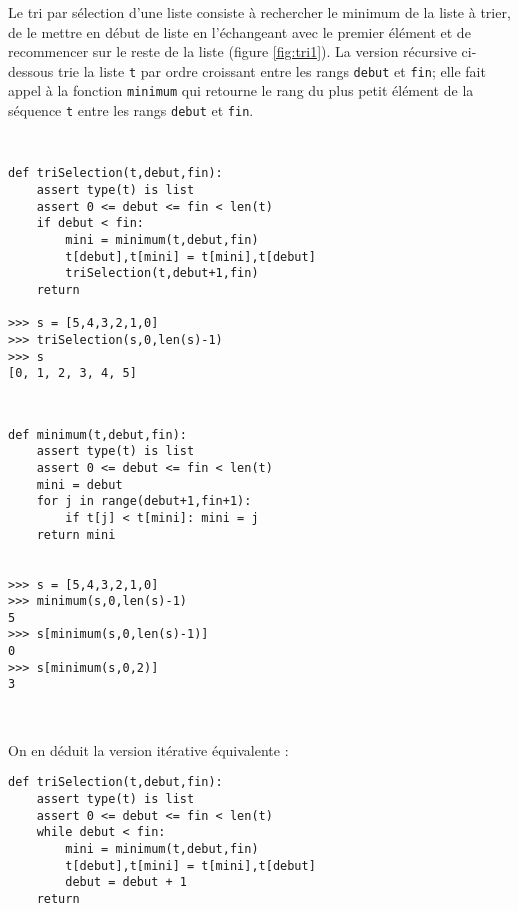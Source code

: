Le tri par sélection d'une liste consiste à rechercher le minimum de la liste
à trier, de le mettre en début de liste en l'échangeant avec le premier élément
et de recommencer sur le reste de la liste (figure \ref{fig:tri1}).
La version récursive ci-dessous trie la liste {\tt t} par ordre croissant 
entre les rangs {\tt debut} et {\tt fin}; elle fait appel à la fonction {\tt minimum}
qui retourne le rang du plus petit élément de la séquence {\tt t} entre les rangs
{\tt debut} et {\tt fin}.
 
\noindent\mbox{}\hspace*{1cm}\begin{py}{8cm}\tt
\begin{verbatim}
def triSelection(t,debut,fin):
    assert type(t) is list
    assert 0 <= debut <= fin < len(t)
    if debut < fin:
        mini = minimum(t,debut,fin)
        t[debut],t[mini] = t[mini],t[debut]
        triSelection(t,debut+1,fin)
    return

>>> s = [5,4,3,2,1,0]
>>> triSelection(s,0,len(s)-1)
>>> s
[0, 1, 2, 3, 4, 5]
\end{verbatim}
\end{py}
\hfill
\begin{py}{7cm}\tt
\begin{verbatim}
def minimum(t,debut,fin):
    assert type(t) is list
    assert 0 <= debut <= fin < len(t)
    mini = debut
    for j in range(debut+1,fin+1):
        if t[j] < t[mini]: mini = j
    return mini


>>> s = [5,4,3,2,1,0]
>>> minimum(s,0,len(s)-1)
5
>>> s[minimum(s,0,len(s)-1)]
0
>>> s[minimum(s,0,2)]
3
\end{verbatim}
\end{py}\\

\newpage
On en déduit la version itérative équivalente :
\begin{lstlisting}[title={\bf Tri par sélection}]
def triSelection(t,debut,fin):
    assert type(t) is list
    assert 0 <= debut <= fin < len(t)
    while debut < fin:
        mini = minimum(t,debut,fin)
        t[debut],t[mini] = t[mini],t[debut]
        debut = debut + 1
    return
\end{lstlisting}

